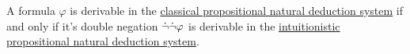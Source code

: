 \begin{theorem}\label{thm:glivenkos_double_negation_theorem}
  A formula \( \varphi \) is derivable in the \hyperref[def:classical_propositional_deductive_systems]{classical propositional natural deduction system} if and only if it's double negation \( \dot\neg \dot\neg \varphi \) is derivable in the \hyperref[def:intuitionistic_propositional_deductive_systems]{intuitionistic propositional natural deduction system}.
\end{theorem}
